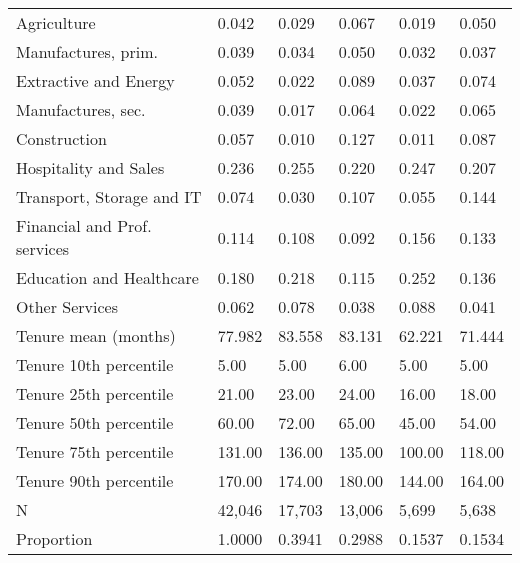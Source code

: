 \begin{tabular}{llllll}
Agriculture                  &   0.042 &   0.029 &   0.067 &              0.019 &            0.050 \\
Manufactures, prim.          &   0.039 &   0.034 &   0.050 &              0.032 &            0.037 \\
Extractive and Energy        &   0.052 &   0.022 &   0.089 &              0.037 &            0.074 \\
Manufactures, sec.           &   0.039 &   0.017 &   0.064 &              0.022 &            0.065 \\
Construction                 &   0.057 &   0.010 &   0.127 &              0.011 &            0.087 \\
Hospitality and Sales        &   0.236 &   0.255 &   0.220 &              0.247 &            0.207 \\
Transport, Storage and IT    &   0.074 &   0.030 &   0.107 &              0.055 &            0.144 \\
Financial and Prof. services &   0.114 &   0.108 &   0.092 &              0.156 &            0.133 \\
Education and Healthcare     &   0.180 &   0.218 &   0.115 &              0.252 &            0.136 \\
Other Services               &   0.062 &   0.078 &   0.038 &              0.088 &            0.041 \\
Tenure mean (months)         &  77.982 &  83.558 &  83.131 &             62.221 &           71.444 \\
Tenure 10th percentile       &    5.00 &    5.00 &    6.00 &               5.00 &             5.00 \\
Tenure 25th percentile       &   21.00 &   23.00 &   24.00 &              16.00 &            18.00 \\
Tenure 50th percentile       &   60.00 &   72.00 &   65.00 &              45.00 &            54.00 \\
Tenure 75th percentile       &  131.00 &  136.00 &  135.00 &             100.00 &           118.00 \\
Tenure 90th percentile       &  170.00 &  174.00 &  180.00 &             144.00 &           164.00 \\
N                            &  42,046 &  17,703 &  13,006 &              5,699 &            5,638 \\
Proportion                   &  1.0000 &  0.3941 &  0.2988 &             0.1537 &           0.1534 \\
\bottomrule
\end{tabular}
